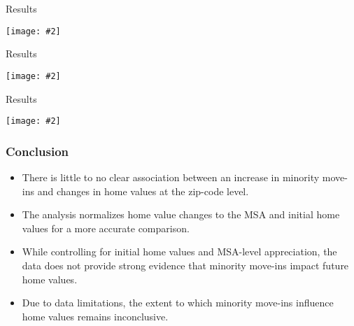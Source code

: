 \documentclass[aspectratio=169]{beamer}
\newcommand {\framedgraphic}[2] {
    \begin{frame}{#1}
        \begin{center}
            \texttt{[image: \#2]}
        \end{center}
    \end{frame}
}
\begin{document}
\framedgraphic{Results}{project_files/project_43_1.png}
\framedgraphic{Results}{project_files/project_46_0.png}
\framedgraphic{Results}{project_files/project_49_1.png}
\begin{frame}
\frametitle{Conclusion}
\begin{itemize}
    \item There is little to no clear association between an increase in minority move-ins and changes in home values at the zip-code level.
    \item The analysis normalizes home value changes to the MSA and initial home values for a more accurate comparison.
    \item While controlling for initial home values and MSA-level appreciation, the data does not provide strong evidence that minority move-ins impact future home values.
    \item Due to data limitations, the extent to which minority move-ins influence home values remains inconclusive.
\end{itemize}
\end{frame}
\end{document}
